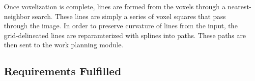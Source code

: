 Once voxelization is complete, lines are formed from the voxels through a nearest-neighbor search. These lines are simply a series of voxel squares that pass through the image. In order to preserve curvature of lines from the input, the grid-delineated lines are reparamterized with splines into paths. These paths are then sent to the work planning module.

\subsection{Requirements Fulfilled}